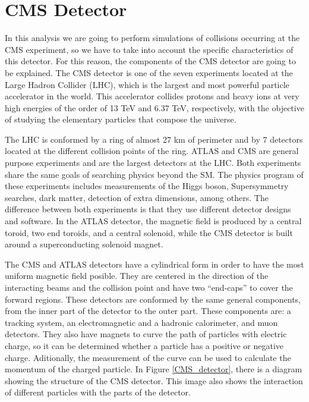 \chapter{CMS Detector}
\label{CMS_chapter}

In this analysis we are going to perform simulations of collisions occurring at the CMS experiment, so we have to take into account the specific characteristics of this detector. For this reason,
the components of the CMS detector are going to be explained. The CMS detector is one of the seven experiments located at the Large Hadron Collider (LHC), which is the largest and most powerful particle accelerator in the world. This accelerator collides protons and heavy ions at very high energies of the order of 13 TeV and 6.37 TeV, respectively, with the objective of studying the elementary particles that compose the universe.


The LHC is conformed by a ring of almost 27 km of perimeter and by 7 detectors located at the different collision points of the ring. ATLAS and CMS are general purpose experiments and are the largest detectors at the LHC. Both experiments share the same goals of searching physics beyond the SM. The physics program of these experiments includes measurements of the Higgs boson, Supersymmetry searches, dark matter, detection of extra dimensions, among others. The difference between both experiments is that they use different detector designs and software. In the ATLAS detector, the magnetic field is produced by a central toroid, two end toroids, and a central solenoid, while the CMS detector is built around a superconducting solenoid magnet.  

The CMS and ATLAS detectors have a cylindrical form in order to have the most uniform magnetic field posible. They are centered in the direction of the interacting beams and the collision point and have two ``end-caps'' to cover the forward regions. These detectors are conformed by the same general components, from the inner part of the detector to the outer part. These components are: a tracking system, an electromagnetic and a hadronic calorimeter, and muon detectors. They also have magnets to curve the path of particles with electric charge, so it can be determined whether a particle has a positive or negative charge. Aditionally, the measurement of the curve can be used to calculate the momentum of the charged particle. In Figure \ref{CMS_detector}, there is a diagram showing the structure of the CMS detector. This image also shows the interaction of different particles with the parts of the detector.

